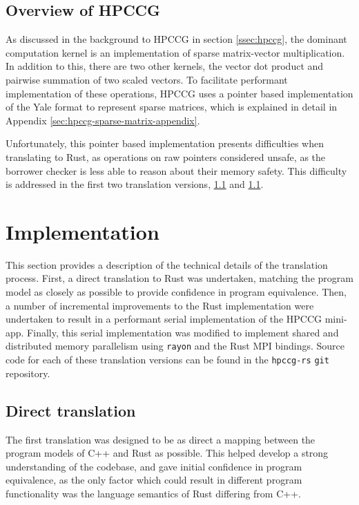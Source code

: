 \subsection{Overview of HPCCG}
\label{sec:overview-hpccg}

As discussed in the background to HPCCG in section \ref{ssec:hpccg}, the dominant computation kernel is an implementation of sparse matrix-vector multiplication. In addition to this, there are two other kernels, the vector dot product and pairwise summation of two scaled vectors. To facilitate performant implementation of these operations, HPCCG uses a pointer based implementation of the Yale format to represent sparse matrices, which is explained in detail in Appendix \ref{sec:hpccg-sparse-matrix-appendix}.

Unfortunately, this pointer based implementation presents difficulties when translating to Rust, as operations on raw pointers considered unsafe, as the borrower checker is less able to reason about their memory safety. This difficulty is addressed in the first two translation versions, \ref{sec:translation-direct} and \ref{sec:translation-direct}.

\section{Implementation}
\label{sec:translation-implementation}

This section provides a description of the technical details of the translation process.
First, a direct translation to Rust was undertaken, matching the program model as closely as possible to provide confidence in program equivalence. Then, a number of incremental improvements to the Rust implementation were undertaken to result in a performant serial implementation of the HPCCG mini-app. Finally, this serial implementation was modified to implement shared and distributed memory parallelism using \texttt{rayon} and the Rust MPI bindings. Source code for each of these translation versions can be found in the \texttt{hpccg-rs} \texttt{git} repository.


\subsection{Direct translation}
\label{sec:translation-direct}
The first translation was designed to be as direct a mapping between the program models of C++ and Rust as possible. This helped develop a strong understanding of the codebase, and gave initial confidence in program equivalence, as the only factor which could result in different program functionality was the language semantics of Rust differing from C++.

